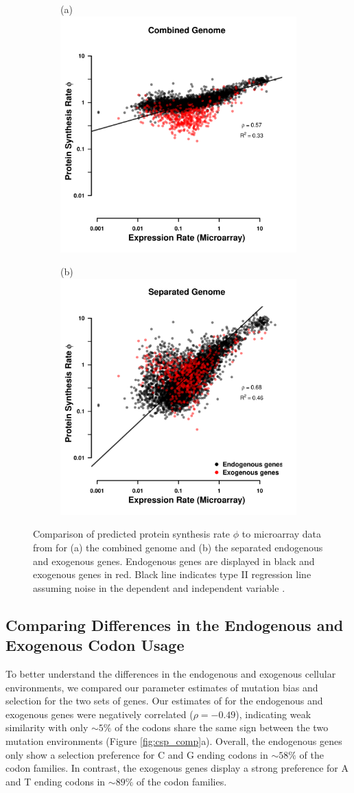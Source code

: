 \documentclass[fleqn,letterpaper]{article}
\begin{document}
\begin{figure}
    \centering
    \begin{subfigure}
        \centering
        (a) \includegraphics[width=.45\textwidth]{img/phi_corr_plot_whole_Genome_estim.pdf}
    \end{subfigure}
    \begin{subfigure}
        \centering
        (b) \includegraphics[width=.45\textwidth]{img/phi_corr_plot_split_Genome_estim.pdf}
    \end{subfigure}
    \caption{Comparison of predicted protein synthesis rate $\phi$ to microarray data from \citet{tsankov2010} for (a) the combined genome and (b) the separated endogenous and exogenous genes. 
    Endogenous genes are displayed in black and exogenous genes in red. 
    Black line indicates type II regression line assuming noise in the dependent and independent variable \citep{SokalAndRohlf1981}.}
    \label{fig:phi_corr_two_cond}
\end{figure}


\subsection*{Comparing Differences in the Endogenous and Exogenous Codon Usage}
To better understand the differences in the endogenous and exogenous cellular environments, we compared our parameter estimates of mutation bias \DM and selection \DE for the two sets of genes.
Our estimates of \DM for the endogenous and exogenous genes were negatively correlated ($\rho = -0.49$),  indicating weak similarity with only $\sim5\%$ of the codons share the same sign between the two mutation environments (Figure \ref{fig:csp_comp}a).
Overall, the endogenous genes only show a selection preference for C and G ending codons in $\sim58\%$ of the codon families.
In contrast, the exogenous genes display a strong preference for A and T ending codons in $\sim89\%$ of the codon families.
\end{document}
